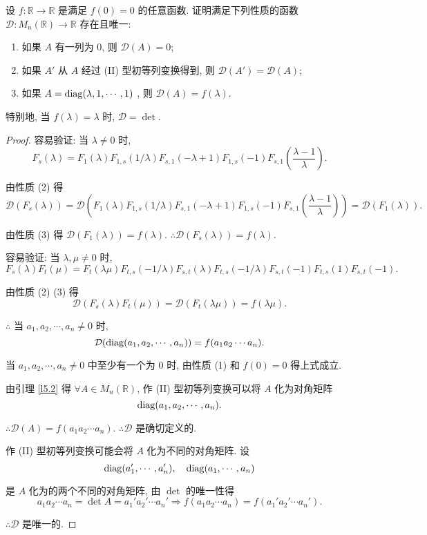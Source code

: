 \documentclass[color=black,device=normal,lang=cn,mode=geye]{elegantnote}
\begin{document}
\begin{exercise}\label{ex4.1}
    设 $f:\mathbb{R}\to\mathbb{R}$ 是满足 $f(0)=0$ 的任意函数. 证明满足下列性质的函数 $\mathcal{D}:M_n(\mathbb{R})\to\mathbb{R}$ 存在且唯一:
    \begin{enumerate}
        \item 如果 $A$ 有一列为 $0$, 则 $\mathcal{D}(A)=0$;
        \item 如果 $A'$ 从 $A$ 经过 (II) 型初等列变换得到, 则 $\mathcal{D}(A')=\mathcal{D}(A)$;
        \item 如果 $A=\operatorname{diag}(\lambda,1,\cdots,1)$ , 则 $\mathcal{D}(A)=f(\lambda)$.
    \end{enumerate}

    特别地, 当 $f(\lambda)=\lambda$ 时, $\mathcal{D}=\det$.
\end{exercise}
\newpage
\begin{proof}
    容易验证: 当 $\lambda\neq0$ 时,
    \[F_s(\lambda)=F_1(\lambda)F_{1,s}(1/\lambda)F_{s,1}(-\lambda+1)F_{1,s}(-1)F_{s,1}\left(\dfrac{\lambda-1}{\lambda}\right).\]

    由性质 (2) 得
    \[\mathcal{D}(F_s(\lambda))=\mathcal{D}\left(F_1(\lambda)F_{1,s}(1/\lambda)F_{s,1}(-\lambda+1)F_{1,s}(-1)F_{s,1}\left(\dfrac{\lambda-1}{\lambda}\right)\right)=\mathcal{D}(F_1(\lambda)).\]

    由性质 (3) 得 $\mathcal{D}(F_1(\lambda))=f(\lambda)$. $\therefore\mathcal{D}(F_s(\lambda))=f(\lambda)$.

    容易验证: 当 $\lambda,\mu\neq0$ 时,
    \[F_s(\lambda)F_t(\mu)=F_t(\lambda\mu)F_{t,s}(-1/\lambda)F_{s,t}(\lambda)F_{t,s}(-1/\lambda)F_{s,t}(-1)F_{t,s}(1)F_{s,t}(-1).\]

    由性质 (2) (3) 得
    \[\mathcal{D}(F_s(\lambda)F_t(\mu))=\mathcal{D}(F_t(\lambda\mu))=f(\lambda\mu).\]
    
    $\therefore$ 当 $a_1,a_2,\cdots,a_n\neq0$ 时,
    \[\mathcal{D}(\operatorname{diag}(a_1,a_2,\cdots,a_n))=f(a_1a_2\cdots a_n).\]

    当 $a_1,a_2,\cdots,a_n\neq0$ 中至少有一个为 $0$ 时, 由性质 (1) 和 $f(0)=0$ 得上式成立.

    由引理 \ref{l5.2} 得 $\forall A\in M_n(\mathbb{R})$, 作 (II) 型初等列变换可以将 $A$ 化为对角矩阵
    \[\operatorname{diag}(a_1,a_2,\cdots,a_n).\]
    
    $\therefore\mathcal{D}(A)=f(a_1a_2\cdots a_n)$. $\therefore\mathcal{D}$ 是确切定义的.

    作 (II) 型初等列变换可能会将 $A$ 化为不同的对角矩阵. 设
    \[\operatorname{diag}(a_1',\cdots,a_n'),\quad\operatorname{diag}(a_1,\cdots,a_n)\]
    
    是 $A$ 化为的两个不同的对角矩阵, 由 $\det$ 的唯一性得
    \[a_1a_2\cdots a_n=\det A=a_1'a_2'\cdots a_n'\Rightarrow f(a_1a_2\cdots a_n)=f(a_1'a_2'\cdots a_n').\]

    $\therefore\mathcal{D}$ 是唯一的.
\end{proof}
\end{document}
